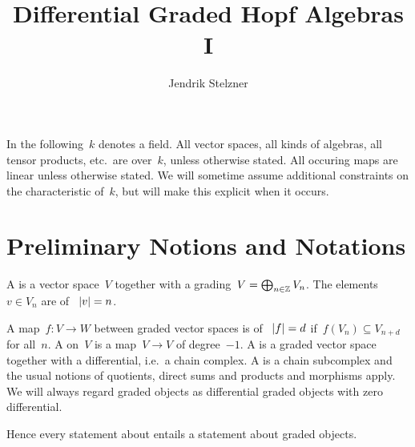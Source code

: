 \documentclass[a4paper,10pt,headings=standardclasses]{scrartcl}
\title{Differential Graded Hopf Algebras I}
\author{Jendrik Stelzner}
\date{}
\begin{document}
\maketitle


In the following~$k$ denotes a field.
All vector spaces, all kinds of algebras, all tensor products, etc.\ are over~$k$, unless otherwise stated.
All occuring maps are linear unless otherwise stated.
We will sometime assume additional constraints on the characteristic of~$k$, but will make this explicit when it occurs.





\section{Preliminary Notions and Notations}

A  is a vector space~$V$ together with a grading~$V = \bigoplus_{n \in \mathbb{Z}} V_n$.
The elements~$v \in V_n$ are  of ~$\lvert v\rvert = n$.
\begin{center}
\end{center}
A map~$f \colon V \to W$ between graded vector spaces is  of ~$\lvert f\rvert = d$ if~$f(V_n) \subseteq V_{n+d}$ for all~$n$.
A  on~$V$ is a map~$V \to V$ of degree~$-1$.
A  is a graded vector space together with a differential, i.e.\ a chain complex.
A {\dgsub} is a chain subcomplex and the usual notions of quotients, direct sums and products and morphisms apply.
We will always regard graded objects as differential graded objects with zero differential.
\begin{center}
\end{center}
Hence every statement about {\dgos} entails a statement about graded objects.
\end{document}
